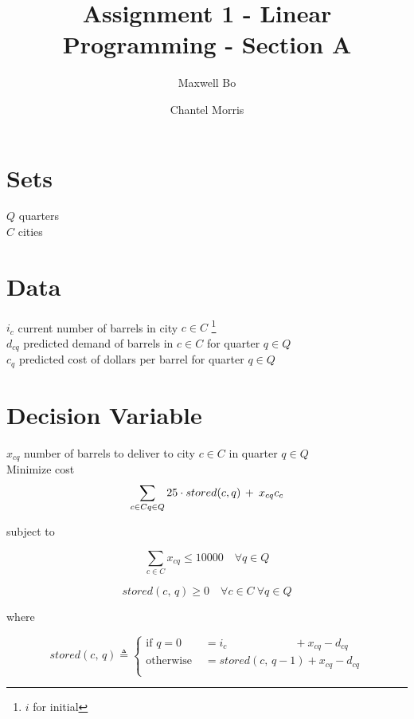 \documentclass[a4paper]{article}
\title{Assignment 1 - Linear Programming - Section A}
\author{Maxwell Bo  \and Chantel Morris}
\begin{document}
 

\maketitle

\section*{Sets}

$Q$ quarters\\
$C$ cities\\

\section*{Data}

$i_c$ current number of barrels in city $c \in C$ \footnote{$i$ for initial}\\
$d_{cq}$ predicted demand of barrels in $c \in C$ for quarter $q \in Q$\\
$c_q$ predicted cost of dollars per barrel for quarter $q \in Q$\\

\section*{Decision Variable}

$x_{cq}$ number of barrels to deliver to city $c \in C$ in quarter $q \in Q$\\

Minimize cost
\[
\sum_{c \in C\\ q \in Q} 25 \cdot stored(c, q)\, +\: x_{cq} c_c
\]

subject to

\[
\sum_{c \in C} x_{cq} \leq 10000 \quad \forall q \in Q
\]


\[
stored(c,\, q) \geq 0 \quad \forall c \in C\ \forall q \in Q
\]

where

\[
stored(c,\, q) \triangleq \begin{cases}
    \text{if }  q = 0 & = i_{c} \quad \qquad \qquad \quad +  x_{cq} - d_{cq}\\
    \text{otherwise } & = stored(c,\, q - 1) + x_{cq} - d_{cq}\\
\end{cases}
\]
\end{document}
